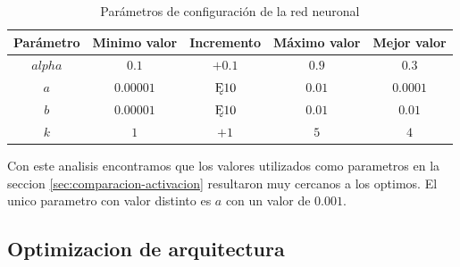 \documentclass[a4paper,10pt]{article}
\begin{document}
        \begin{table}
            \begin{tabular}{|c|c|c|c|c|}
                \hline
                Parámetro & Minimo valor & Incremento & Máximo valor & Mejor valor \\ \hline
                $alpha$ & $0.1$ & $+ 0.1$ & $0.9$ & $0.3$ \\ \hline
                $a$ & $0.00001$ & $\Cross 10$ & $0.01$ & $0.0001$ \\ \hline
                $b$ & $0.00001$ & $\Cross 10$ & $0.01$ & $0.01$ \\ \hline
                $k$ & $1$ & $+ 1$ & $5$ & $4$ \\ \hline
            \end{tabular}
            \caption{Parámetros de configuración de la red neuronal}
            \label{tabla_configuracion}
        \end{table}

        Con este analisis encontramos que los valores utilizados como parametros en la seccion \ref{sec:comparacion-activacion} resultaron muy cercanos a los optimos.
        El unico parametro con valor distinto es $a$ con un valor de $0.001$.

    \subsection{Optimizacion de arquitectura}
    \label{sec:arquitectura-optima}



\end{document}
